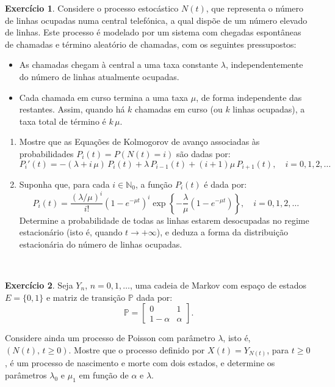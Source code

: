 \documentclass[
  11pt,
  a4paper,
]{book}
\theoremstyle{definition}
\theoremstyle{definition}
\theoremstyle{definition}
\newtheorem{exercise}{Exercício}[chapter]
\theoremstyle{definition}
\theoremstyle{remark}
\begin{document}
\begin{exercise}
\leavevmode

Considere o processo estocástico \(N(t)\), que representa o número de linhas ocupadas numa central telefónica, a qual dispõe de um número elevado de linhas. Este processo é modelado por um sistema com chegadas espontâneas de chamadas e término aleatório de chamadas, com os seguintes pressupostos:

\begin{itemize}
\item
  As chamadas chegam à central a uma taxa constante \(\lambda\), independentemente do número de linhas atualmente ocupadas.
\item
  Cada chamada em curso termina a uma taxa \(\mu\), de forma independente das restantes. Assim, quando há \(k\) chamadas em curso (ou \(k\) linhas ocupadas), a taxa total de término é \(k\,\mu\).
\end{itemize}

\begin{enumerate}
\def\labelenumi{(\alph{enumi})}
\item
  Mostre que as Equações de Kolmogorov de avanço associadas às probabilidades \(P_i(t) = P(N(t) = i)\) são dadas por:
  \[
  P_i'(t) = -(\lambda + i\,\mu)\,P_i(t) + \lambda\,P_{i-1}(t) + (i+1)\mu\,P_{i+1}(t), \quad i = 0,1,2,\ldots
  \]
\item
  Suponha que, para cada \(i \in \mathbb{N}_0\), a função \(P_i(t)\) é dada por:
  \[
  P_i(t) = \frac{(\lambda/\mu)^i}{i!} \left( 1 - e^{-\mu t} \right)^i \exp\left\{ -\frac{\lambda}{\mu} \left( 1 - e^{-\mu t} \right) \right\}, \quad i = 0,1,2,\ldots
  \]
  Determine a probabilidade de todas as linhas estarem desocupadas no regime estacionário (isto é, quando \(t \to +\infty\)), e deduza a forma da distribuição estacionária do número de linhas ocupadas.
\end{enumerate}

\end{exercise}

\(\,\)

\begin{exercise}
\leavevmode

Seja \(Y_n\), \(n = 0,1,\ldots\), uma cadeia de Markov com espaço de estados \(E = \{0,1\}\) e matriz de transição \(\mathbb{P}\) dada por:
\[
\mathbb{P} =
\begin{bmatrix}
0 & 1 \\
1 - \alpha & \alpha
\end{bmatrix}.
\]

Considere ainda um processo de Poisson com parâmetro \(\lambda\), isto é, \((N(t),\, t \geq 0)\). Mostre que o processo definido por \(X(t) = Y_{N(t)}\), para \(t \geq 0\), é um processo de nascimento e morte com dois estados, e determine os parâmetros \(\lambda_0\) e \(\mu_1\) em função de \(\alpha\) e \(\lambda\).

\end{exercise}
\end{document}

